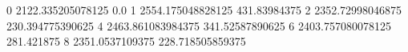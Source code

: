 0 2122.335205078125 0.0
1 2554.175048828125 431.83984375
2 2352.72998046875 230.394775390625
4 2463.861083984375 341.52587890625
6 2403.757080078125 281.421875
8 2351.0537109375 228.718505859375
